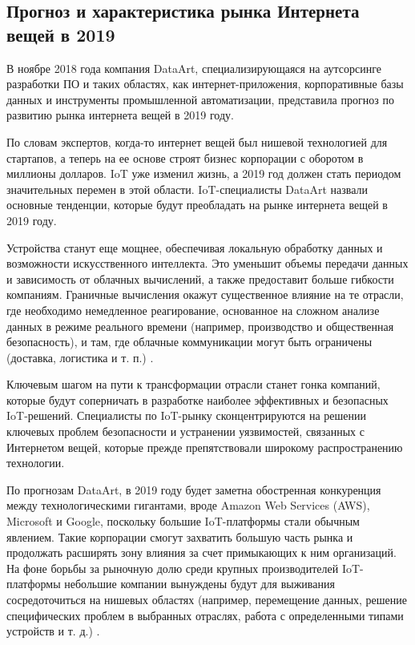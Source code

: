 \subsection{Прогноз и характеристика рынка Интернета вещей в 2019}
\label{sec:analysis:data_art}

В ноябре 2018 года компания DataArt, специализирующаяся на аутсорсинге разработки ПО и таких областях, как интернет-приложения, корпоративные базы данных и инструменты промышленной автоматизации, представила прогноз по развитию рынка интернета вещей в 2019 году.

По словам экспертов, когда-то интернет вещей был нишевой технологией для стартапов, а теперь на ее основе строят бизнес корпорации с оборотом в миллионы долларов. IoT уже изменил жизнь, а 2019 год должен стать периодом значительных перемен в этой области. IoT-специалисты DataArt назвали основные тенденции, которые будут преобладать на рынке интернета вещей в 2019 году.

Устройства станут еще мощнее, обеспечивая локальную обработку данных и возможности искусственного интеллекта. Это уменьшит объемы передачи данных и зависимость от облачных вычислений, а также предоставит больше гибкости компаниям. Граничные вычисления окажут существенное влияние на те отрасли, где необходимо немедленное реагирование, основанное на сложном анализе данных в режиме реального времени (например, производство и общественная безопасность), и там, где облачные коммуникации могут быть ограничены (доставка, логистика и т. п.) \cite{iot_data_2019}.

Ключевым шагом на пути к трансформации отрасли станет гонка компаний, которые будут соперничать в разработке наиболее эффективных и безопасных IoT-решений. Специалисты по IoT-рынку сконцентрируются на решении ключевых проблем безопасности и устранении уязвимостей, связанных с Интернетом вещей, которые прежде препятствовали широкому распространению технологии.

По прогнозам DataArt, в 2019 году будет заметна обостренная конкуренция между технологическими гигантами, вроде Amazon Web Services (AWS), Microsoft и Google, поскольку большие IoT-платформы стали обычным явлением. Такие корпорации смогут захватить большую часть рынка и продолжать расширять зону влияния за счет примыкающих к ним организаций. На фоне борьбы за рыночную долю среди крупных производителей IoT-платформы небольшие компании вынуждены будут для выживания сосредоточиться на нишевых областях (например, перемещение данных, решение специфических проблем в выбранных отраслях, работа с определенными типами устройств и т. д.) \cite{iot_data_2019}.

